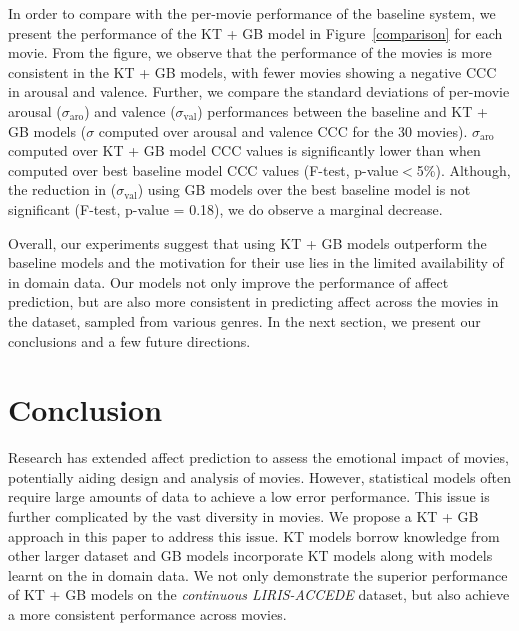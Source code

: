 \documentclass{article}
\begin{document}
\begin{spacing}{0.9}
In order to compare with the per-movie performance of the baseline system, we present the performance of the KT + GB model in Figure~\ref{comparison} for each movie.
From the figure, we observe that the performance of the movies is more consistent in the KT + GB models, with fewer movies showing a negative CCC in arousal and valence.
Further, we compare the standard deviations of per-movie arousal ($\sigma_\text{aro}$) and valence ($\sigma_\text{val}$) performances between the baseline and KT + GB models ($\sigma$ computed over arousal and valence CCC for the 30 movies). 
$\sigma_\text{aro}$ computed over KT + GB model CCC values is significantly lower than when computed over best baseline model CCC values (F-test, p-value$<$5\%). 
Although, the reduction in ($\sigma_\text{val}$) using GB models over the best baseline model is not significant (F-test, p-value = 0.18), we do observe a marginal decrease. 

Overall, our experiments suggest that using KT + GB models outperform the baseline models and the motivation for their use lies in the limited availability of in domain data.
Our models not only improve the performance of affect prediction, but are also more consistent in predicting affect across the movies in the dataset, sampled from various genres.
In the next section, we present our conclusions and a few future directions.

\vspace{-3mm}
\section{Conclusion}
\vspace{-3mm}

Research has extended affect prediction to assess the emotional impact of movies, potentially aiding design and analysis of movies.
However, statistical models often require large amounts of data to achieve a low error performance. 
This issue is further complicated by the vast diversity in movies.
We propose a KT + GB approach in this paper to address this issue.
KT models borrow knowledge from other larger dataset and GB models incorporate KT models along with models learnt on the in domain data. 
We not only demonstrate the superior performance of KT + GB models on the {\it continuous LIRIS-ACCEDE} dataset, but also achieve a more consistent performance across movies.


\end{spacing}
\end{document}
